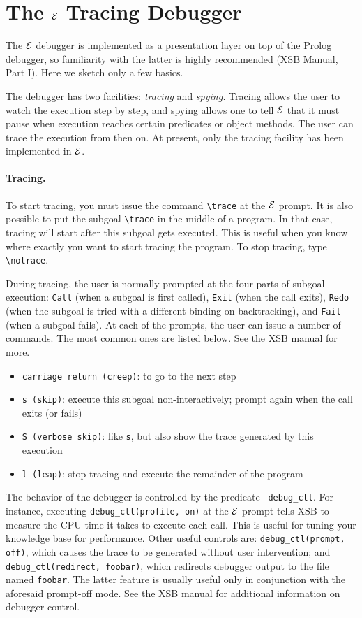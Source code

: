 \documentclass[11pt]{article}
\newcommand{\ERGO}{\mbox{\ensuremath{\cal{E}}\smaller{{\sc{RGO}}}}\xspace}
\newcommand{\FLSYSTEM}{\ERGO}
\newcommand{\bs}{\textbackslash}
\begin{document}
\section{The \FLSYSTEM Tracing Debugger}\label{sec-debugger}


The \FLSYSTEM debugger is implemented as a presentation layer on top of the Prolog
debugger, so familiarity with the latter is highly recommended (XSB Manual,
Part I). Here we sketch only a few basics.

The debugger has two facilities: \emph{tracing} and \emph{spying.} Tracing
allows the user to watch the execution step by step, and
spying allows one to tell \FLSYSTEM that it must pause when execution reaches
certain predicates or object methods. The user can trace the execution from
then on. At present, only the tracing facility has been implemented in
\FLSYSTEM.

\index{\bs{}trace}
\index{\bs{}notrace}
\paragraph{Tracing.}
To start tracing, you must issue the command {\tt \bs{}trace} at the
\FLSYSTEM prompt. It is also possible to put the subgoal {\tt \bs{}trace} in
the middle of a program. In that case, tracing will start after this
subgoal gets executed. This is useful when you know where exactly you want
to start tracing the program. To stop tracing, type {\tt \bs{}notrace}.

During tracing, the user is normally prompted at the four parts of subgoal
execution: {\tt Call} (when a subgoal is first called), {\tt Exit} (when
the call exits), {\tt Redo} (when the subgoal is tried with a different
binding on backtracking), and {\tt Fail} (when a subgoal fails).
At each of the prompts, the user can issue a number of commands. The most
common ones are listed below. See the XSB manual for more.
\begin{itemize}
  \item {\tt carriage return (creep)}:  to go to the next step  
  \item {\tt s (skip)}: execute this subgoal non-interactively; prompt
    again when the call exits (or fails)
  \item {\tt S (verbose skip)}: like {\tt s}, but also show the trace
    generated by this execution
  \item {\tt l (leap)}: stop tracing and execute the remainder of the
    program
\end{itemize}
The behavior of the debugger is controlled by the predicate {\tt
  debug\_ctl}. For instance, executing {\tt debug\_ctl(profile, on)} at the
\FLSYSTEM prompt tells XSB to measure the CPU time it takes to execute each
call. This is useful for tuning your knowledge base for performance. Other useful
controls are: {\tt debug\_ctl(prompt, off)}, which causes the trace to be
generated without user intervention; and {\tt debug\_ctl(redirect,
  foobar)}, which redirects debugger output to the file named {\tt foobar}.
The latter feature is usually useful only in conjunction with the aforesaid
prompt-off mode. See the XSB manual for additional information on debugger
control.
\end{document}
